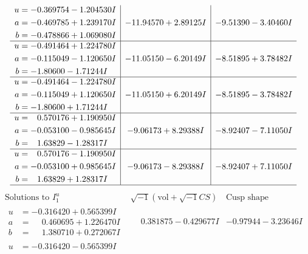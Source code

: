 \documentclass[1p]{elsarticle_modified}
\theoremstyle{definition}
\newcommand{\I}{\sqrt{-1}}
\begin{document}
$$\begin{array}{c|c|c}
\begin{aligned}
u &= -0.369754 - 1.204530 I \\
a &= -0.469785 + 1.239170 I \\
b &= -0.478866 + 1.069080 I\end{aligned}
 & -11.94570 + 2.89125 I & -9.51390 - 3.40460 I \\ \hline\begin{aligned}
u &= -0.491464 + 1.224780 I \\
a &= -0.115049 - 1.120650 I \\
b &= -1.80600 - 1.71244 I\end{aligned}
 & -11.05150 - 6.20149 I & -8.51895 + 3.78482 I \\ \hline\begin{aligned}
u &= -0.491464 - 1.224780 I \\
a &= -0.115049 + 1.120650 I \\
b &= -1.80600 + 1.71244 I\end{aligned}
 & -11.05150 + 6.20149 I & -8.51895 - 3.78482 I \\ \hline\begin{aligned}
u &= \phantom{-}0.570176 + 1.190950 I \\
a &= -0.053100 - 0.985645 I \\
b &= \phantom{-}1.63829 - 1.28317 I\end{aligned}
 & -9.06173 + 8.29388 I & -8.92407 - 7.11050 I \\ \hline\begin{aligned}
u &= \phantom{-}0.570176 - 1.190950 I \\
a &= -0.053100 + 0.985645 I \\
b &= \phantom{-}1.63829 + 1.28317 I\end{aligned}
 & -9.06173 - 8.29388 I & -8.92407 + 7.11050 I\\
 \hline 
 \end{array}$$\newpage$$\begin{array}{c|c|c}  
\text{Solutions to }I^u_{1}& \I (\text{vol} + \sqrt{-1}CS) & \text{Cusp shape}\\
 \hline 
\begin{aligned}
u &= -0.316420 + 0.565399 I \\
a &= \phantom{-}0.460695 + 1.226470 I \\
b &= \phantom{-}1.380710 + 0.272067 I\end{aligned}
 & \phantom{-}0.381875 - 0.429677 I & -0.97944 - 3.23646 I \\ \hline\begin{aligned}
u &= -0.316420 - 0.565399 I \\

\end{aligned}
\end{array}$$
\end{document}
